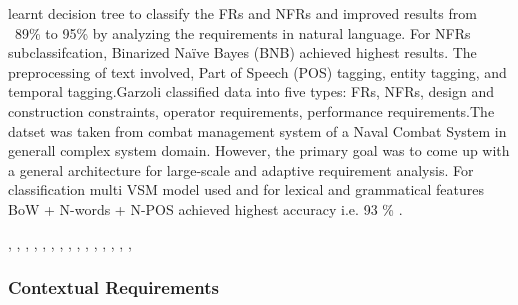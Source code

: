 learnt decision tree to classify the FRs and NFRs and improved results from ~89\% to 95\% by analyzing the requirements in natural language. For NFRs subclassifcation, Binarized Naïve Bayes (BNB) achieved highest results. The preprocessing of text involved, Part of Speech (POS) tagging, entity tagging, and temporal tagging.Garzoli \cite {Garzoli:2013} classified data into five types: FRs, NFRs, design and construction constraints, operator requirements, performance requirements.The datset was taken from combat management system of a Naval Combat System in generall complex system domain. However, the primary goal was to come up with a general architecture for large-scale and adaptive requirement analysis. For classification multi VSM model used and for lexical and grammatical features BoW + N-words + N-POS achieved highest accuracy i.e. 93 \% .



\cite{Deocadez:2017}, \cite{Kurtanovic:2017}, \cite{Guzman:2017},
\cite{Abad:2017}, \cite{Dekhtyar:2017}, \cite{Rashwan:2012}, \cite{Lu:2017},
\cite{Hayes:2014}, \cite{Williams:2017}, \cite{Garzoli:2013},
\cite{Casamayor:2010}, \cite{Wang:2016}, \cite{Hussain:2012}, \cite{Jiang:2014},
\cite{Jha:2017}, \cite{Pinquie:2015}



\subsubsection{Contextual Requirements} 

